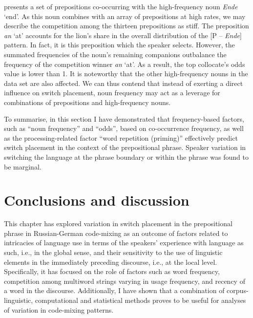  presents a set of prepositions co-occurring with the high-frequency noun \textit{Ende} `end'. As this noun combines with an array of prepositions at high rates, we may describe the competition among the thirteen prepositions as stiff. The preposition \textit{an} `at' accounts for the lion's share in the overall distribution of the [P -- \textit{Ende}] pattern. In fact, it is this preposition which the speaker selects. However, the summated frequencies of the noun's remaining companions outbalance the frequency of the competition winner \textit{an} `at'. As a result, the top collocate's odds value is lower than 1. It is noteworthy that the other high-frequency nouns in the data set are also affected. We can thus contend that instead of exerting a direct influence on switch placement, noun frequency may act as a leverage for combinations of prepositions and high-frequency nouns.  

To summarise, in this section I have demonstrated that frequency-based factors, such as “noun frequency” and “odds”, based on co-occurrence frequency, as well as the processing-related factor “word repetition (priming)” effectively predict switch placement in the context of the prepositional phrase. Speaker variation in switching the language at the phrase boundary or within the phrase was found to be marginal.

\section{Conclusions and discussion}

This chapter has explored variation in switch placement in the prepositional phrase in Russian-German code-mixing as an outcome of factors related to intricacies of language use in terms of the speakers’ experience with language as such, i.e., in the global sense, and their sensitivity to the use of linguistic elements in the immediately preceding discourse, i.e., at the local level. Specifically, it has focused on the role of factors such as word frequency, competition among multiword strings varying in usage frequency, and recency of a word in the discourse. Additionally, I have shown that a combination of corpus-linguistic, computational and statistical methods proves to be useful for analyses of variation in code-mixing patterns.

